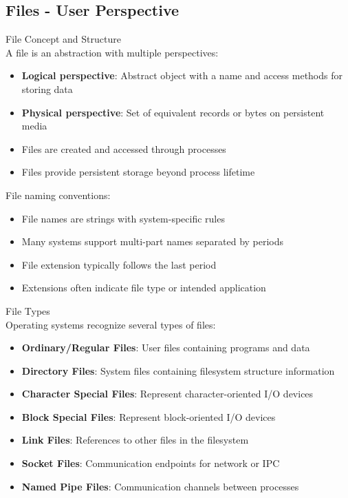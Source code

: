 \subsection{Files - User Perspective}

\begin{definition}{File Concept and Structure}\\
    A file is an abstraction with multiple perspectives:
    \begin{itemize}
        \item \textbf{Logical perspective}: Abstract object with a name and access methods for storing data
        \item \textbf{Physical perspective}: Set of equivalent records or bytes on persistent media
        \item Files are created and accessed through processes
        \item Files provide persistent storage beyond process lifetime
    \end{itemize}
    
    File naming conventions:
    \begin{itemize}
        \item File names are strings with system-specific rules
        \item Many systems support multi-part names separated by periods
        \item File extension typically follows the last period
        \item Extensions often indicate file type or intended application
    \end{itemize}
\end{definition}

\begin{definition}{File Types}\\
    Operating systems recognize several types of files:
    \begin{itemize}
        \item \textbf{Ordinary/Regular Files}: User files containing programs and data
        \item \textbf{Directory Files}: System files containing filesystem structure information
        \item \textbf{Character Special Files}: Represent character-oriented I/O devices
        \item \textbf{Block Special Files}: Represent block-oriented I/O devices
        \item \textbf{Link Files}: References to other files in the filesystem
        \item \textbf{Socket Files}: Communication endpoints for network or IPC
        \item \textbf{Named Pipe Files}: Communication channels between processes
    \end{itemize}
\end{definition}

